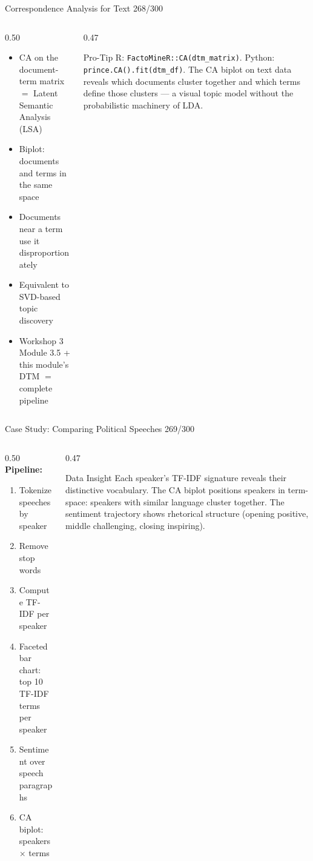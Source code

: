 \documentclass[10pt]{beamer}
\newcommand{\smark}[1]{\hfill{\scriptsize\color{codegray}#1}}
\begin{document}
\begin{frame}{Correspondence Analysis for Text}
\smark{268/300}
\begin{columns}[T]
\begin{column}{0.50\textwidth}
\begin{itemize}
    \item CA on the document-term matrix $=$ Latent Semantic Analysis (LSA)
    \item Biplot: documents and terms in the same space
    \item Documents near a term use it disproportionately
    \item Equivalent to SVD-based topic discovery
    \item Workshop 3 Module 3.5 + this module's DTM $=$ complete pipeline
\end{itemize}
\end{column}
\begin{column}{0.47\textwidth}
\begin{alertblock}{Pro-Tip}
    \scriptsize R: \texttt{FactoMineR::CA(dtm\_matrix)}. Python: \texttt{prince.CA().fit(dtm\_df)}. The CA biplot on text data reveals which documents cluster together and which terms define those clusters --- a visual topic model without the probabilistic machinery of LDA.
\end{alertblock}
\end{column}
\end{columns}
\end{frame}

\begin{frame}{Case Study: Comparing Political Speeches}
\smark{269/300}
\begin{columns}[T]
\begin{column}{0.50\textwidth}
    \textbf{Pipeline:}
    \begin{enumerate}
        \item Tokenize speeches by speaker
        \item Remove stop words
        \item Compute TF-IDF per speaker
        \item Faceted bar chart: top 10 TF-IDF terms per speaker
        \item Sentiment over speech paragraphs
        \item CA biplot: speakers $\times$ terms
    \end{enumerate}
\end{column}
\begin{column}{0.47\textwidth}
\begin{exampleblock}{Data Insight}
    \scriptsize Each speaker's TF-IDF signature reveals their distinctive vocabulary. The CA biplot positions speakers in term-space: speakers with similar language cluster together. The sentiment trajectory shows rhetorical structure (opening positive, middle challenging, closing inspiring).
\end{exampleblock}
\end{column}
\end{columns}
\end{frame}
\end{document}
